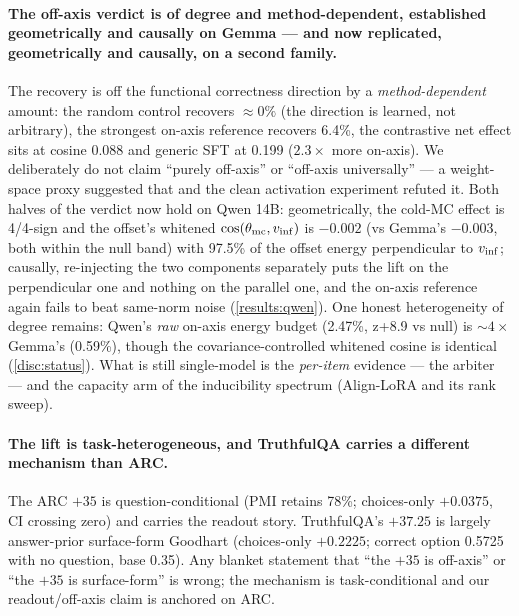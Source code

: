 \paragraph{The off-axis verdict is of degree and method-dependent, established
geometrically and causally on Gemma --- and now replicated, geometrically and
causally, on a second family.}
The recovery is off the functional correctness direction by a
\emph{method-dependent} amount: the random control recovers ${\approx}0\%$ (the
direction is learned, not arbitrary), the strongest on-axis reference recovers
6.4\%, the contrastive net effect sits at cosine 0.088 and generic SFT at 0.199
($2.3\times$ more on-axis). We deliberately do not claim ``purely off-axis'' or
``off-axis universally'' --- a weight-space proxy suggested that and the clean
activation experiment refuted it. Both halves of the verdict now hold on Qwen 14B:
geometrically, the cold-MC effect is 4/4-sign and the offset's whitened
$\cos(\theta_{\mathrm{mc}}, v_{\mathrm{inf}})$ is $-0.002$ (vs Gemma's $-0.003$, both within the null band)
with 97.5\% of the offset energy perpendicular to $v_{\mathrm{inf}}$; causally, re-injecting the
two components separately puts the lift on the perpendicular one and nothing on the
parallel one, and the on-axis reference again fails to beat same-norm noise
(\cref{results:qwen}). One honest heterogeneity of degree remains: Qwen's \emph{raw}
on-axis energy budget (2.47\%, z+8.9 vs null) is ${\sim}4\times$ Gemma's (0.59\%),
though the covariance-controlled whitened cosine is identical (\cref{disc:status}).
What is still single-model is the \emph{per-item} evidence --- the arbiter --- and
the capacity arm of the inducibility spectrum (Align-LoRA and its rank sweep).

\paragraph{The lift is task-heterogeneous, and TruthfulQA carries a different
mechanism than ARC.}
The ARC $+35$ is question-conditional (PMI retains 78\%; choices-only $+0.0375$, CI
crossing zero) and carries the readout story. TruthfulQA's $+37.25$ is largely
answer-prior surface-form Goodhart (choices-only $+0.2225$; correct option 0.5725
with no question, base 0.35). Any blanket statement that ``the $+35$ is off-axis''
or ``the $+35$ is surface-form'' is wrong; the mechanism is task-conditional and
our readout/off-axis claim is anchored on ARC.

